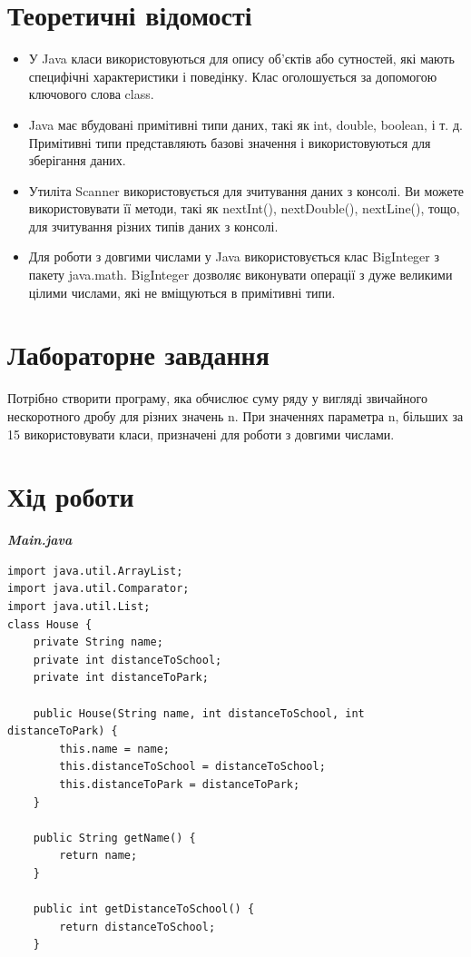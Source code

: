 \documentclass[14pt]{extreport}
\begin{document}
\begin{normalsize}
	\section*{Теоретичні відомості}
	\begin{itemize}
		\item У Java класи використовуються для опису об’єктів або сутностей, які мають специфічні характеристики і поведінку. Клас оголошується за допомогою ключового слова class.
		\item Java має вбудовані примітивні типи даних, такі як int, double, boolean, і т. д. Примітивні типи представляють базові значення і використовуються для зберігання даних.
		\item Утиліта Scanner використовується для зчитування даних з консолі. Ви можете використовувати її методи, такі як nextInt(), nextDouble(), nextLine(), тощо, для зчитування різних типів даних з консолі.
		\item Для роботи з довгими числами у Java використовується клас BigInteger з пакету java.math. BigInteger дозволяє виконувати операції з дуже великими цілими числами, які не вміщуються в примітивні типи.
	\end{itemize}

	\section*{Лабораторне завдання}
	Потрібно створити програму, яка обчислює суму ряду у вигляді звичайного нескоротного дробу для різних значень n. При значеннях параметра n, більших за 15 використовувати класи, призначені для роботи з довгими числами. 
	
	\section*{Хід роботи}

	\textbf{\textit{Main.java}}
	\begin{lstlisting}
import java.util.ArrayList;
import java.util.Comparator;
import java.util.List;
class House {
	private String name;
	private int distanceToSchool;
	private int distanceToPark;
	
	public House(String name, int distanceToSchool, int distanceToPark) {
		this.name = name;
		this.distanceToSchool = distanceToSchool;
		this.distanceToPark = distanceToPark;
	}
	
	public String getName() {
		return name;
	}
	
	public int getDistanceToSchool() {
		return distanceToSchool;
	}
	

\end{lstlisting}
\end{normalsize}
\end{document}
